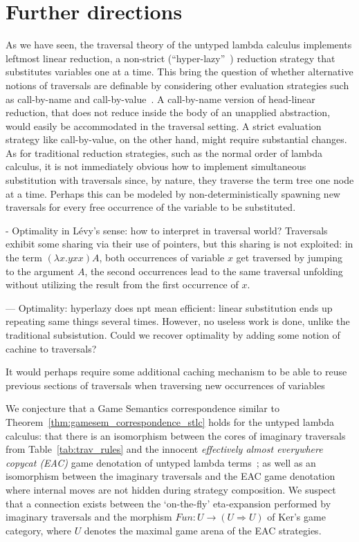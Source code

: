 \documentclass{elsarticle}
\theoremstyle{plain}
\theoremstyle{definition}
\begin{document}
\section{Further directions}

As we have seen, the traversal theory of the untyped lambda calculus implements leftmost linear reduction, a non-strict (``hyper-lazy''~\cite{danosherbelinregnier1996}) reduction strategy that substitutes variables one at a time. This bring the question of whether alternative notions of traversals are definable by considering other evaluation strategies such as call-by-name and call-by-value~\cite{plotkin-75}. A call-by-name version of head-linear reduction, that does not reduce inside the body of an unapplied abstraction, would easily be accommodated in the traversal setting. A strict evaluation strategy like call-by-value, on the other hand, might require substantial changes. As for traditional reduction strategies, such as the normal order of lambda calculus, it is not immediately obvious how to implement simultaneous substitution with traversals since, by nature, they traverse the term tree one node at a time. Perhaps this can be modeled by non-deterministically spawning new traversals for every free occurrence of the variable to be substituted.


\begin{todobox}
- Optimality in L\'evy's sense: how to interpret in traversal world?
Traversals exhibit some sharing via their use of pointers, but this sharing is not exploited: in the term $(\lambda x. y x x) A$, both occurrences of variable $x$ get traversed by jumping to the argument $A$, the second occurrences lead to the same traversal unfolding without utilizing the result from the first occurrence of $x$.

--- Optimality: hyperlazy does npt mean efficient: linear substitution ends up repeating same things several times. However, no useless work is done, unlike the traditional subsistution. Could we recover optimality by adding some notion of cachine to traversals?

It would perhaps require some additional caching mechanism to be able to reuse previous sections of traversals when traversing new occurrences of variables

\end{todobox}


We conjecture that a Game Semantics correspondence similar
to Theorem~\ref{thm:gamesem_correspondence_stlc} holds for
the untyped lambda calculus: that there is an isomorphism between the cores of imaginary traversals from Table~\ref{tab:trav_rules} and the innocent \emph{effectively almost everywhere copycat (EAC)} game denotation of untyped lambda terms~\cite{KerThesis}; as well as an isomorphism between the imaginary traversals and the EAC game denotation where internal moves are not hidden during strategy composition. We suspect that a connection exists between the `on-the-fly' eta-expansion performed by imaginary traversals and the morphism $Fun : U \rightarrow (U \Rightarrow U)$ of Ker's game category, where $U$ denotes the maximal game arena of the EAC strategies.
\end{document}
